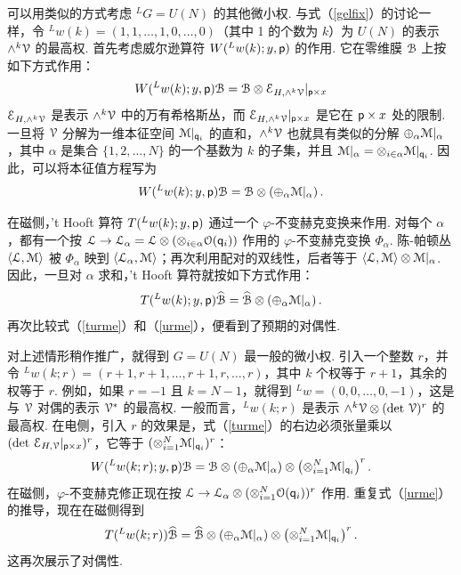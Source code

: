 可以用类似的方式考虑 $^LG=U(N)$ 的其他微小权. 与式（\ref{gelfix}）的讨论一样，令 $^Lw(k)=(1,1,\dots,1,0,\dots,0)$（其中 1 的个数为 $k$）为 $U(N)$ 的表示 $\wedge^k{\cal V}$ 的最高权. 首先考虑威尔逊算符 $W({}^Lw(k);y,{\sf p})$ 的作用. 它在零维膜 ${\cal B}$ 上按如下方式作用：
\begin{equation}\label{owactos} W({}^Lw(k);y,{\sf p}){\cal B}={\cal
B}\otimes {\mathcal E}_{H,\wedge^k\cal V}|_{{\sf p}\times x}\end{equation}
${\mathcal E}_{H,\wedge^k\cal V}$ 是表示 $\wedge^k\cal V$ 中的万有希格斯丛，而 ${\mathcal E}_{H,\wedge^k\cal V}|_{{\sf p}\times x}$ 是它在 ${\sf p}\times x$ 处的限制. 一旦将 ${\cal V}$ 分解为一维本征空间 ${\cal M}|_{{\sf q}_i}$ 的直和，$\wedge^k{\cal V}$ 也就具有类似的分解 $\oplus_{\alpha} {\cal M}|_\alpha$，其中 $\alpha$ 是集合 $\{1,2,\dots,N\}$ 的一个基数为 $k$ 的子集，并且 ${\cal M}|_\alpha=\otimes_{i\in\alpha}{\cal M}|_{{\sf q}_i}$. 因此，可以将本征值方程写为
\begin{equation}\label{turme}W({}^Lw(k);y,{\sf p}){\cal B}={\cal
B}\otimes \left(\oplus_{\alpha}{\cal M}|_\alpha\right).\end{equation}

在磁侧，'t Hooft 算符 $T({}^Lw(k);y,{\sf p})$ 通过一个 $\varphi$-不变赫克变换来作用. 对每个 $\alpha$，都有一个按 ${\cal L}\to {\cal L}_\alpha={\cal L}\otimes\left(\otimes_{i\in \alpha}{\cal O}({\sf q}_i)\right)$ 作用的 $\varphi$-不变赫克变换 $\Phi_\alpha$. 陈-帕顿丛 $\langle{\cal L},{\cal M}\rangle$ 被 $\Phi_\alpha$ 映到 $\langle{\cal L}_\alpha,{\cal M}\rangle$；再次利用配对的双线性，后者等于 $\langle{\cal L},{\cal M}\rangle\otimes {\cal M}|_\alpha$. 因此，一旦对 $\alpha$ 求和，'t Hooft 算符就按如下方式作用：
\begin{equation}\label{urme}T({}^Lw(k);y,{\sf p})\widehat{\cal B}=\widehat{\cal
B}\otimes\left(\oplus_\alpha {\cal M}|_\alpha\right).\end{equation} 再次比较式（\ref{turme}）和（\ref{urme}），便看到了预期的对偶性.

对上述情形稍作推广，就得到 $G=U(N)$ 最一般的微小权. 引入一个整数 $r$，并令 $^Lw(k;r)=(r+1,r+1,\dots,r+1,r,\dots,r)$，其中 $k$ 个权等于 $r+1$，其余的权等于 $r$. 例如，如果 $r=-1$ 且 $k=N-1$，就得到 $^Lw=(0,0,\dots,0,-1)$，这是与 ${\cal V}$ 对偶的表示 ${\cal V}^*$ 的最高权. 一般而言，$^Lw(k;r)$ 是表示 $\wedge^k{\cal V}\otimes (\det\,{\cal V})^r$ 的最高权. 在电侧，引入 $r$ 的效果是，式（\ref{turme}）的右边必须张量乘以 $(\det\,{\mathcal E}_{H,{\cal V}}|_{{\sf p}\times x})^r$，它等于 $(\otimes_{i=1}^N{\cal M}|_{{\sf q}_i})^r$：
\begin{equation}\label{zurme}W({}^Lw(k;r);y,{\sf p}){\cal B}={\cal
B}\otimes \left(\oplus_{\alpha}{\cal
M}|_\alpha\right)\otimes\left(\otimes_{i=1}^N{\cal
M}|_{{\sf q}_i}\right)^r.\end{equation} 在磁侧，$\varphi$-不变赫克修正现在按 ${\cal L}\to{\cal L}_\alpha\otimes(\otimes_{i=1}^N{\cal O}({\sf q}_i))^r$ 作用. 重复式（\ref{urme}）的推导，现在在磁侧得到
\begin{equation}\label{ozurme}T({}^Lw(k;r))\widehat{\cal B}=\widehat{\cal
B}\otimes\left(\oplus_{\alpha}{\cal
M}|_\alpha\right)\otimes\left(\otimes_{i=1}^N{\cal
M}|_{{\sf q}_i}\right)^r.\end{equation}
这再次展示了对偶性.

